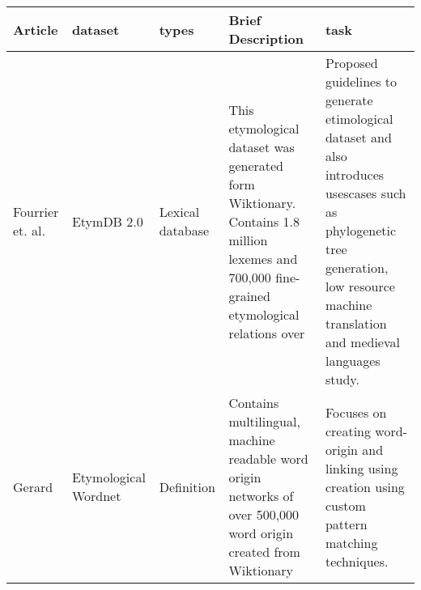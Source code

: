 \begin{table}[htbp]
    \centering
    \begin{tabular}{|p{2cm}|p{2cm}|p{2cm}|p{4cm}|p{4cm}|}\hline
        Article                                              & dataset                                                                                                           & types                                                                                         & Brief Description                                                                                                                                                                    & task                                                                                                                                  \\ \hline
        Fourrier et. al. \cite{fourrier_methodological_2020} & EtymDB 2.0                                                                                                        & Lexical database                                                                              & This etymological dataset was generated form Wiktionary. Contains 1.8 million lexemes and 700,000 fine-grained etymological relations over                                           & Proposed guidelines to generate etimological dataset and also introduces usescases such as phylogenetic tree generation, low resource
        machine translation and medieval languages study.                                                                                                                                                                                                                                                                                                                                                                                                                                                                                                                                                       \\ \hline
        Gerard \cite{demelo_etymological_2014}               & Etymological Wordnet                                                                                              & Definition                                                                                    & Contains multilingual, machine readable word origin networks of over  500,000 word origin created from Wiktionary                                                                    & Focuses on creating word-origin and linking using creation using custom pattern matching techniques.                                  \\ \hline


\end{tabular}
\end{table}
